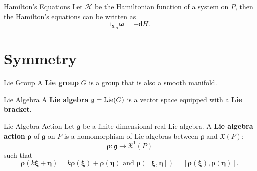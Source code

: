 \documentclass{beamer}
\begin{document}
\begin{frame}{}
  \begin{block}{Hamilton's Equations}
    Let \(\mathcal{H}\) be the Hamiltonian function of a system on \(P\), then the Hamilton's equations can be written as
    \begin{equation}
      \mathsf{i} _{\boldsymbol{X} _{H}} \boldsymbol{\omega} = - \mathsf{d} H.
    \end{equation}
  \end{block}
\end{frame}

\section{Symmetry}
\begin{frame}{}
  \begin{block}{Lie Group}
    A \textbf{Lie group} \(G\) is a group that is also a smooth manifold.
  \end{block}

  \begin{block}{Lie Algebra}
    A \textbf{Lie algebra} \(\mathfrak{g} = \operatorname{Lie} (G)\) is a vector space equipped with a \textbf{Lie bracket}.
  \end{block}
\end{frame}

\begin{frame}{}
  \begin{block}{Lie Algebra Action}
    Let \(\mathfrak{g}\) be a finite dimensional real Lie algebra. A \textbf{Lie algebra action} \(\boldsymbol{\rho}\) of \(\mathfrak{g}\) on \(P\) is a homomorphism of Lie algebras between \(\mathfrak{g}\) and \(\mathfrak{X} (P)\):
    \begin{equation}
      \boldsymbol{\rho} : \mathfrak{g} \to \mathfrak{X} ^{1} (P)
    \end{equation}
    such that
    \begin{equation}
      \boldsymbol{\rho} (k \boldsymbol{\xi} + \boldsymbol{\eta}) = k \boldsymbol{\rho} (\boldsymbol{\xi}) + \boldsymbol{\rho} (\boldsymbol{\eta}) \text{ and } \boldsymbol{\rho} (\left[ \boldsymbol{\xi}, \boldsymbol{\eta} \right]) = \left[ \boldsymbol{\rho} (\boldsymbol{\xi}), \boldsymbol{\rho} (\boldsymbol{\eta}) \right].
    \end{equation}
  \end{block}
\end{frame}
\end{document}
